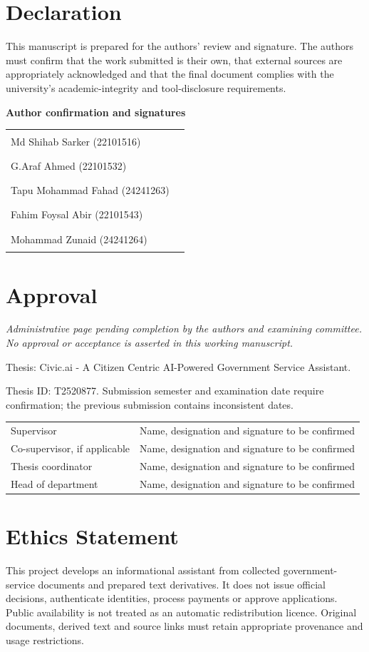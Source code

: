 \chapter*{Declaration}
This manuscript is prepared for the authors' review and signature. The authors must confirm that the work submitted is their own, that external sources are appropriately acknowledged and that the final document complies with the university's academic-integrity and tool-disclosure requirements.

\textbf{Author confirmation and signatures}

\begin{tabularx}{\linewidth}{Xl}
Md Shihab Sarker (22101516) & \rule{40mm}{0.4pt}\\[7mm]
G.Araf Ahmed (22101532) & \rule{40mm}{0.4pt}\\[7mm]
Tapu Mohammad Fahad (24241263) & \rule{40mm}{0.4pt}\\[7mm]
Fahim Foysal Abir (22101543) & \rule{40mm}{0.4pt}\\[7mm]
Mohammad Zunaid (24241264) & \rule{40mm}{0.4pt}
\end{tabularx}
\clearpage
\chapter*{Approval}
\textit{Administrative page pending completion by the authors and examining committee. No approval or acceptance is asserted in this working manuscript.}

Thesis: Civic.ai - A Citizen Centric AI-Powered Government Service Assistant.

Thesis ID: T2520877. Submission semester and examination date require confirmation; the previous submission contains inconsistent dates.
\vspace{8mm}

\begin{tabularx}{\linewidth}{p{45mm}X}
Supervisor & Name, designation and signature to be confirmed\\[12mm]
Co-supervisor, if applicable & Name, designation and signature to be confirmed\\[12mm]
Thesis coordinator & Name, designation and signature to be confirmed\\[12mm]
Head of department & Name, designation and signature to be confirmed
\end{tabularx}
\clearpage
\chapter*{Ethics Statement}
This project develops an informational assistant from collected government-service documents and prepared text derivatives. It does not issue official decisions, authenticate identities, process payments or approve applications. Public availability is not treated as an automatic redistribution licence. Original documents, derived text and source links must retain appropriate provenance and usage restrictions.

